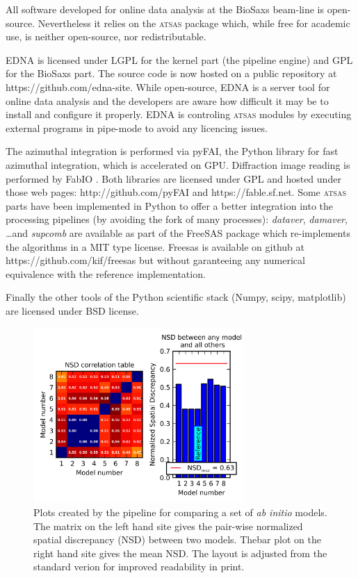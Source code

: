 \documentclass[preprint,pdf]{iucr}              %
\begin{document}
All software developed for online data analysis at the BioSaxs beam-line is
open-source.
Nevertheless it relies on the \textsc{atsas} package which, while free for
academic use, is neither open-source, nor redistributable.

EDNA is licensed under LGPL for the kernel part (the pipeline engine) and GPL
for the BioSaxs part. The source code is now hosted on a public
repository at https://github.com/edna-site. While open-source, EDNA is a
server tool for online data analysis and the developers are aware how difficult
it may be to install and configure it properly. EDNA is controling
\textsc{atsas} modules by executing external programs in pipe-mode to avoid any
licencing issues.

The azimuthal integration is performed via pyFAI\cite{pyfai}, the Python library
for fast azimuthal integration, which is accelerated on GPU\cite{pyfai_gpu}.
Diffraction image reading is performed by FabIO \cite{fabio}.
Both libraries
are licensed under GPL and hosted under those web pages:
http://github.com/pyFAI and https://fable.sf.net.
Some \textsc{atsas} parts have been implemented in Python to offer a better
integration into the processing pipelines (by avoiding the fork of many
processes): \textit{dataver}, \textit{damaver}, \ldots  and \textit{supcomb}
are available as part of the FreeSAS package which re-implements the
algorithms in a MIT type license. Freesas is available on github at
https://github.com/kif/freesas but without garanteeing any
numerical equivalence with the reference implementation.

Finally the other tools of the Python scientific stack (Numpy, scipy,
matplotlib) are licensed under BSD license.

\begin{figure}
\centering
\includegraphics[width=8cm]{nsd.png}%
\caption{Plots created by the pipeline for comparing a set of \textit{ab initio} models. The matrix on the left hand site gives the pair-wise normalized spatial discrepancy (NSD) between two models. Thebar plot on the right hand site gives the mean NSD. The layout is adjusted from the standard verion for improved readability in print.}
\label{fgr:nsd}
\end{figure}
\end{document}
